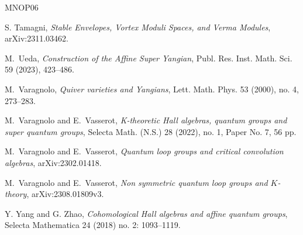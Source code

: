 \documentclass[10pt]{amsart}
\theoremstyle{definition}
\numberwithin{equation}{section}
\begin{document}
\begin{thebibliography}{MNOP06}






 S. Tamagni, \textit{Stable Envelopes, Vortex Moduli Spaces, and Verma Modules}, arXiv:2311.03462.






 M.~Ueda, \textit{Construction of the Affine Super Yangian}, Publ. Res. Inst. Math. Sci. 59 (2023), 423--486.

 M.~Varagnolo, \textit{Quiver varieties and Yangians}, Lett. Math. Phys. 53 (2000), no. 4, 273--283.

 M.~Varagnolo and E.~Vasserot, \textit{K-theoretic Hall algebras, quantum groups and super quantum groups}, 
Selecta Math. (N.S.) 28 (2022), no. 1, Paper No. 7, 56 pp.


M.~Varagnolo and E.~Vasserot, \textit{Quantum loop groups and critical convolution algebras}, arXiv:2302.01418.

M.~Varagnolo and E.~Vasserot, \textit{Non symmetric quantum loop groups and $K$-theory},
arXiv:2308.01809v3.




 Y. Yang and G. Zhao, \textit{Cohomological Hall algebras and affine quantum groups}, Selecta Mathematica 24 (2018) no. 2: 1093--1119.


\end{thebibliography}
\end{document}
